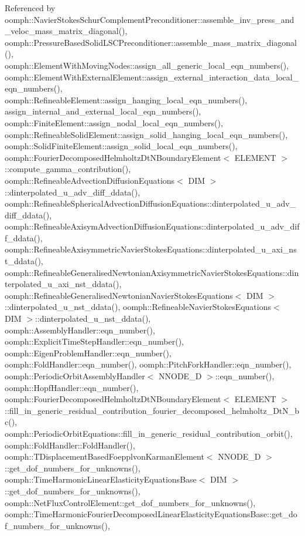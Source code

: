 Referenced by oomph\+::\+Navier\+Stokes\+Schur\+Complement\+Preconditioner\+::assemble\+\_\+inv\+\_\+press\+\_\+and\+\_\+veloc\+\_\+mass\+\_\+matrix\+\_\+diagonal(), oomph\+::\+Pressure\+Based\+Solid\+L\+S\+C\+Preconditioner\+::assemble\+\_\+mass\+\_\+matrix\+\_\+diagonal(), oomph\+::\+Element\+With\+Moving\+Nodes\+::assign\+\_\+all\+\_\+generic\+\_\+local\+\_\+eqn\+\_\+numbers(), oomph\+::\+Element\+With\+External\+Element\+::assign\+\_\+external\+\_\+interaction\+\_\+data\+\_\+local\+\_\+eqn\+\_\+numbers(), oomph\+::\+Refineable\+Element\+::assign\+\_\+hanging\+\_\+local\+\_\+eqn\+\_\+numbers(), assign\+\_\+internal\+\_\+and\+\_\+external\+\_\+local\+\_\+eqn\+\_\+numbers(), oomph\+::\+Finite\+Element\+::assign\+\_\+nodal\+\_\+local\+\_\+eqn\+\_\+numbers(), oomph\+::\+Refineable\+Solid\+Element\+::assign\+\_\+solid\+\_\+hanging\+\_\+local\+\_\+eqn\+\_\+numbers(), oomph\+::\+Solid\+Finite\+Element\+::assign\+\_\+solid\+\_\+local\+\_\+eqn\+\_\+numbers(), oomph\+::\+Fourier\+Decomposed\+Helmholtz\+Dt\+N\+Boundary\+Element$<$ E\+L\+E\+M\+E\+N\+T $>$\+::compute\+\_\+gamma\+\_\+contribution(), oomph\+::\+Refineable\+Advection\+Diffusion\+Equations$<$ D\+I\+M $>$\+::dinterpolated\+\_\+u\+\_\+adv\+\_\+diff\+\_\+ddata(), oomph\+::\+Refineable\+Spherical\+Advection\+Diffusion\+Equations\+::dinterpolated\+\_\+u\+\_\+adv\+\_\+diff\+\_\+ddata(), oomph\+::\+Refineable\+Axisym\+Advection\+Diffusion\+Equations\+::dinterpolated\+\_\+u\+\_\+adv\+\_\+diff\+\_\+ddata(), oomph\+::\+Refineable\+Axisymmetric\+Navier\+Stokes\+Equations\+::dinterpolated\+\_\+u\+\_\+axi\+\_\+nst\+\_\+ddata(), oomph\+::\+Refineable\+Generalised\+Newtonian\+Axisymmetric\+Navier\+Stokes\+Equations\+::dinterpolated\+\_\+u\+\_\+axi\+\_\+nst\+\_\+ddata(), oomph\+::\+Refineable\+Generalised\+Newtonian\+Navier\+Stokes\+Equations$<$ D\+I\+M $>$\+::dinterpolated\+\_\+u\+\_\+nst\+\_\+ddata(), oomph\+::\+Refineable\+Navier\+Stokes\+Equations$<$ D\+I\+M $>$\+::dinterpolated\+\_\+u\+\_\+nst\+\_\+ddata(), oomph\+::\+Assembly\+Handler\+::eqn\+\_\+number(), oomph\+::\+Explicit\+Time\+Step\+Handler\+::eqn\+\_\+number(), oomph\+::\+Eigen\+Problem\+Handler\+::eqn\+\_\+number(), oomph\+::\+Fold\+Handler\+::eqn\+\_\+number(), oomph\+::\+Pitch\+Fork\+Handler\+::eqn\+\_\+number(), oomph\+::\+Periodic\+Orbit\+Assembly\+Handler$<$ N\+N\+O\+D\+E\+\_\+D $>$\+::eqn\+\_\+number(), oomph\+::\+Hopf\+Handler\+::eqn\+\_\+number(), oomph\+::\+Fourier\+Decomposed\+Helmholtz\+Dt\+N\+Boundary\+Element$<$ E\+L\+E\+M\+E\+N\+T $>$\+::fill\+\_\+in\+\_\+generic\+\_\+residual\+\_\+contribution\+\_\+fourier\+\_\+decomposed\+\_\+helmholtz\+\_\+\+Dt\+N\+\_\+bc(), oomph\+::\+Periodic\+Orbit\+Equations\+::fill\+\_\+in\+\_\+generic\+\_\+residual\+\_\+contribution\+\_\+orbit(), oomph\+::\+Fold\+Handler\+::\+Fold\+Handler(), oomph\+::\+T\+Displacement\+Based\+Foepplvon\+Karman\+Element$<$ N\+N\+O\+D\+E\+\_\+D $>$\+::get\+\_\+dof\+\_\+numbers\+\_\+for\+\_\+unknowns(), oomph\+::\+Time\+Harmonic\+Linear\+Elasticity\+Equations\+Base$<$ D\+I\+M $>$\+::get\+\_\+dof\+\_\+numbers\+\_\+for\+\_\+unknowns(), oomph\+::\+Net\+Flux\+Control\+Element\+::get\+\_\+dof\+\_\+numbers\+\_\+for\+\_\+unknowns(), oomph\+::\+Time\+Harmonic\+Fourier\+Decomposed\+Linear\+Elasticity\+Equations\+Base\+::get\+\_\+dof\+\_\+numbers\+\_\+for\+\_\+unknowns(), 